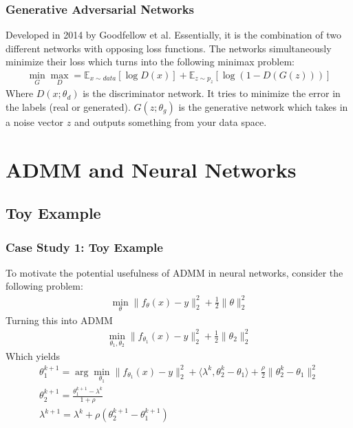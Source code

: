 \documentclass{beamer}
\begin{document}

\begin{frame}
\frametitle{Generative Adversarial Networks}
  Developed in 2014 by Goodfellow et al. Essentially, it is the combination of two different networks with opposing loss functions. The networks simultaneously minimize their loss which turns into the following minimax problem:
  \begin{gather*}
    \min_G \max_D = \mathbb{E}_{x \sim data} [\log D(x)] + \mathbb{E}_{z \sim p_z} [\log (1- D(G(z)))]
  \end{gather*}
  Where $D(x; \theta_d)$ is the discriminator network. It tries to minimize the error in the labels (real or generated). $G(z; \theta_g)$ is the generative network which takes in a noise vector $z$ and outputs something from your data space.
\end{frame}


\section{ADMM and Neural Networks}

\subsection{Toy Example}

\begin{frame}
\frametitle{Case Study 1: Toy Example}
  To motivate the potential usefulness of ADMM in neural networks, consider the following problem:
  \begin{gather*}
    \min_\theta \lVert f_\theta (x) - y \rVert_2^2 + \frac{1}{2} \lVert \theta \rVert_2^2
  \end{gather*}
  Turning this into ADMM
  \begin{gather*}
    \min_{\theta_1, \theta_2} \lVert f_{\theta_1} (x) - y\rVert_2^2 + \frac{1}{2} \lVert \theta_2 \rVert_2^2
  \end{gather*}
  Which yields
  \begin{gather*}
    \theta_1^{k+1} = \arg\min_{\theta_1} \lVert f_{\theta_1}(x) - y \rVert_2^2 + \langle \lambda^k, \theta_2^k - \theta_1 \rangle + \frac{\rho}{2} \lVert \theta_2^k - \theta_1 \rVert_2^2 \\
    \theta_2^{k+1} = \frac{\theta_1^{k+1} - \lambda^k}{1 + \rho} \\
    \lambda^{k+1} = \lambda^k + \rho (\theta_2^{k+1} - \theta_1^{k+1})
  \end{gather*}
\end{frame}
\end{document}
